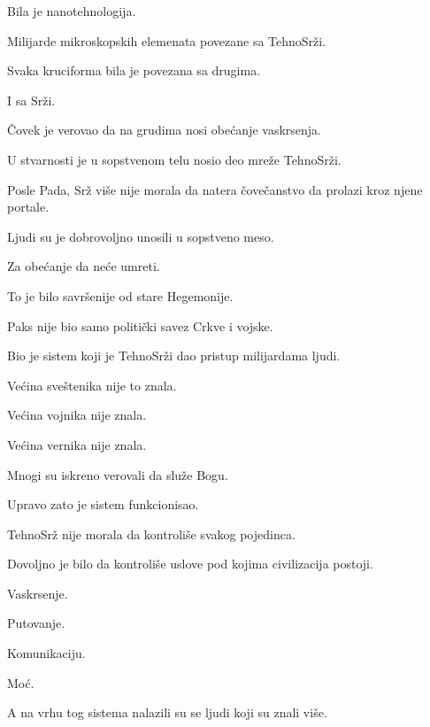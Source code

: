 Bila je nanotehnologija.

Milijarde mikroskopskih elemenata povezane sa TehnoSrži.

\bigskip

Svaka kruciforma bila je povezana sa drugima.

I sa Srži.

\bigskip

Čovek je verovao da na grudima nosi obećanje vaskrsenja.

\bigskip

U stvarnosti je u sopstvenom telu nosio deo mreže TehnoSrži.

\bigskip

Posle Pada, Srž više nije morala da natera čovečanstvo da prolazi kroz njene portale.

\bigskip

Ljudi su je dobrovoljno unosili u sopstveno meso.

\bigskip

Za obećanje da neće umreti.

\bigskip

To je bilo savršenije od stare Hegemonije.

\bigskip

Paks nije bio samo politički savez Crkve i vojske.

Bio je sistem koji je TehnoSrži dao pristup milijardama ljudi.

\bigskip

Većina sveštenika nije to znala.

Većina vojnika nije znala.

Većina vernika nije znala.

\bigskip

Mnogi su iskreno verovali da služe Bogu.

\bigskip

Upravo zato je sistem funkcionisao.

\bigskip

TehnoSrž nije morala da kontroliše svakog pojedinca.

Dovoljno je bilo da kontroliše uslove pod kojima civilizacija postoji.

\bigskip

Vaskrsenje.

Putovanje.

Komunikaciju.

Moć.

\bigskip

A na vrhu tog sistema nalazili su se ljudi koji su znali više.

